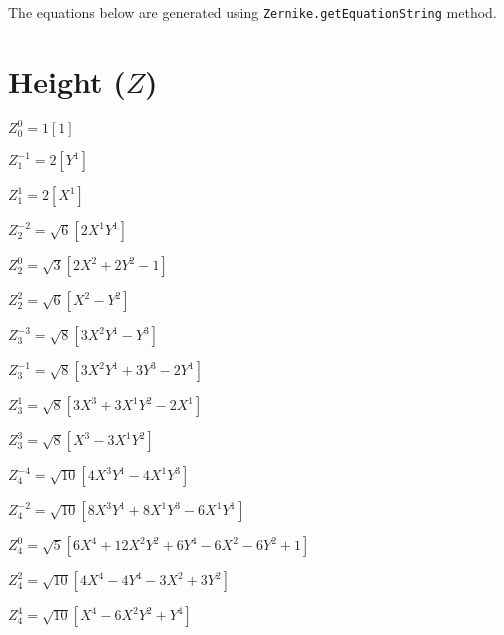 \documentclass[10pt,landscape]{article}
\begin{document}
\noindent The equations below are generated using \texttt{Zernike.getEquationString} method.

\section{Height ($Z$)}

\noindent $ Z^{0}_{0} = 1 [1] $

\vspace{1.2 mm}
\noindent $ Z^{-1}_{1} = 2 [Y^{1}] $

\vspace{1.2 mm}
\noindent $ Z^{1}_{1} = 2 [X^{1}] $

\vspace{1.2 mm}
\noindent $ Z^{-2}_{2} = \sqrt{6} [2X^{1}Y^{1}] $

\vspace{1.2 mm}
\noindent $ Z^{0}_{2} = \sqrt{3} [2X^{2} +2Y^{2} -1] $

\vspace{1.2 mm}
\noindent $ Z^{2}_{2} = \sqrt{6} [X^{2} -Y^{2}] $

\vspace{1.2 mm}
\noindent $ Z^{-3}_{3} = \sqrt{8} [3X^{2}Y^{1} -Y^{3}] $

\vspace{1.2 mm}
\noindent $ Z^{-1}_{3} = \sqrt{8} [3X^{2}Y^{1} +3Y^{3} -2Y^{1}] $

\vspace{1.2 mm}
\noindent $ Z^{1}_{3} = \sqrt{8} [3X^{3} +3X^{1}Y^{2} -2X^{1}] $

\vspace{1.2 mm}
\noindent $ Z^{3}_{3} = \sqrt{8} [X^{3} -3X^{1}Y^{2}] $

\vspace{1.2 mm}
\noindent $ Z^{-4}_{4} = \sqrt{10} [4X^{3}Y^{1} -4X^{1}Y^{3}] $

\vspace{1.2 mm}
\noindent $ Z^{-2}_{4} = \sqrt{10} [8X^{3}Y^{1} +8X^{1}Y^{3} -6X^{1}Y^{1}] $

\vspace{1.2 mm}
\noindent $ Z^{0}_{4} = \sqrt{5} [6X^{4} +12X^{2}Y^{2} +6Y^{4} -6X^{2} -6Y^{2} +1] $

\vspace{1.2 mm}
\noindent $ Z^{2}_{4} = \sqrt{10} [4X^{4} -4Y^{4} -3X^{2} +3Y^{2}] $

\vspace{1.2 mm}
\noindent $ Z^{4}_{4} = \sqrt{10} [X^{4} -6X^{2}Y^{2} +Y^{4}] $
\end{document}
